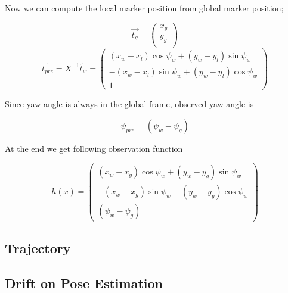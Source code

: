 \documentclass[14pt,a4paper]{article}
\begin{document}
		
		Now we can compute the local marker position from global marker position;
		
		\[\vec{t_{g}}= \left( \begin{array}{c}
						x_{g} \\ y_{g}\\ 
				\end{array} \right)\] 	
		$$
			\tilde{t_{pre}}  = X^{-1} \tilde{t_{w}}
			= \begin{pmatrix}
					(x_{w} - x_{l})\cos\psi_{w}	 +	(y_{w}-y_{l})\sin\psi_{w}\\ 	
					-(x_{w} - x_{l})\sin\psi_{w} +	(y_{w}-y_{l})\cos\psi_{w}\\
												1
				\end{pmatrix}
		$$
		
		Since yaw angle is always in the global frame, observed yaw angle is
		
		\[ \psi_{pre}=(\psi_{w} - \psi_{g})\]
		
		At the end we get following observation function
		
		$$
		h(x)	= \begin{pmatrix}
					(x_{w} - x_{g})\cos\psi_{w}	 +	(y_{w}-y_{g})\sin\psi_{w}\\ 	
					-(x_{w} - x_{g})\sin\psi_{w} +	(y_{w}-y_{g})\cos\psi_{w}\\
											(\psi_{w} - \psi_{g})
			\end{pmatrix}
		$$
		
		
	\subsection{Trajectory}
		
	
	\subsection{Drift on Pose Estimation}
	
\end{document}
